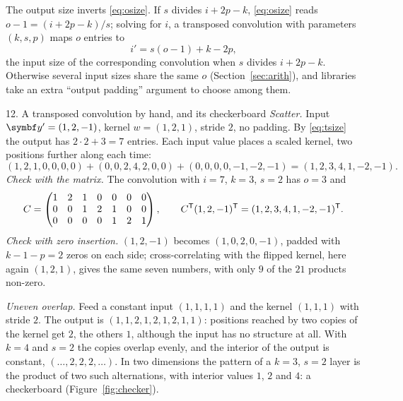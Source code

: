 \documentclass[11pt]{article}
\newcommand{\y}{\vect{y}}
\begin{document}
The output size inverts \eqref{eq:osize}. If $s$ divides $i + 2p - k$, \eqref{eq:osize} reads $o - 1 = (i + 2p - k)/s$;
solving for $i$, a transposed convolution with parameters $(k, s, p)$ maps $o$ entries to
\begin{equation}\label{eq:tsize}
  i' = s(o - 1) + k - 2p ,
\end{equation}
the input size of the corresponding convolution when $s$ divides $i + 2p - k$. Otherwise several input sizes share the
same $o$ (Section~\ref{sec:arith}), and libraries take an extra ``output padding'' argument to choose among them.

\begin{worked}{12. A transposed convolution by hand, and its checkerboard}
\emph{Scatter.} Input $\y' = (1, 2, -1)$, kernel $w = (1, 2, 1)$, stride $2$, no padding. By \eqref{eq:tsize} the output
has $2 \cdot 2 + 3 = 7$ entries. Each input value places a scaled kernel, two positions further along each time:
\[
  (1, 2, 1, 0, 0, 0, 0) + (0, 0, 2, 4, 2, 0, 0) + (0, 0, 0, 0, -1, -2, -1) = (1, 2, 3, 4, 1, -2, -1) .
\]
\emph{Check with the matrix.} The convolution with $i = 7$, $k = 3$, $s = 2$ has $o = 3$ and
\[
  C = \begin{pmatrix} 1 & 2 & 1 & 0 & 0 & 0 & 0 \\ 0 & 0 & 1 & 2 & 1 & 0 & 0 \\ 0 & 0 & 0 & 0 & 1 & 2 & 1 \end{pmatrix},
  \qquad C^{\mathsf{T}}(1, 2, -1)^{\mathsf{T}} = (1, 2, 3, 4, 1, -2, -1)^{\mathsf{T}} .
\]
\emph{Check with zero insertion.} $(1, 2, -1)$ becomes $(1, 0, 2, 0, -1)$, padded with $k - 1 - p = 2$ zeros on each side;
cross-correlating with the flipped kernel, here again $(1, 2, 1)$, gives the same seven numbers, with only $9$ of the
$21$ products non-zero.

\emph{Uneven overlap.} Feed a constant input $(1, 1, 1, 1)$ and the kernel $(1, 1, 1)$ with stride $2$. The output is
$(1, 1, 2, 1, 2, 1, 2, 1, 1)$: positions reached by two copies of the kernel get $2$, the others $1$, although the input
has no structure at all. With $k = 4$ and $s = 2$ the copies overlap evenly, and the interior of the output is constant,
$(\dots, 2, 2, 2, \dots)$. In two dimensions the pattern of a $k = 3$, $s = 2$ layer is the product of two such
alternations, with interior values $1$, $2$ and $4$: a checkerboard (Figure~\ref{fig:checker}).
\end{worked}
\end{document}
